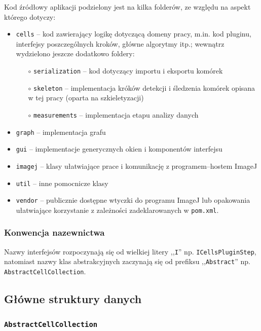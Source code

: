 \documentclass[declaration,shortabstract,mgr]{iithesis}
\begin{document}
Kod źródłowy aplikacji podzielony jest na kilka folderów, ze względu na aspekt którego dotyczy:

\begin{itemize}
  \item \texttt{cells} -- kod zawierający logikę dotyczącą domeny pracy, m.in. kod pluginu, interfejsy poszczególnych kroków, główne algorytmy itp.; wewnątrz wydzielono jeszcze dodatkowo foldery: 
  \begin{itemize}
    \item[$\circ$] \texttt{serialization} -- kod dotyczący importu i eksportu komórek
    \item[$\circ$] \texttt{skeleton} -- implementacja króków detekcji i śledzenia komórek opisana w tej pracy (oparta na szkieletyzacji)
    \item[$\circ$] \texttt{measurements} -- implementacja etapu analizy danych
  \end{itemize}
  \item \texttt{graph} -- implementacja grafu
  \item \texttt{gui} -- implementacje generycznych okien i komponentów interfejsu
  \item \texttt{imagej} -- klasy ułatwiające prace i komunikację z programem--hostem ImageJ
  \item \texttt{util} -- inne pomocnicze klasy
  \item \texttt{vendor} -- publicznie dostępne wtyczki do programu ImageJ lub opakowania ułatwiające korzystanie z zależności zadeklarowanych w \texttt{pom.xml}.
\end{itemize}

\subsubsection{Konwencja nazewnictwa}

Nazwy interfejsów rozpoczynają się od wielkiej litery ,,\texttt{I}'' np. \texttt{ICellsPluginStep}, natomiast nazwy klas abstrakcyjnych zaczynają się od prefiksu ,,\texttt{Abstract}'' np. \texttt{AbstractCellCollection}.

\subsection{Główne struktury danych}

\subsubsection{\texttt{AbstractCellCollection}}
\end{document}
